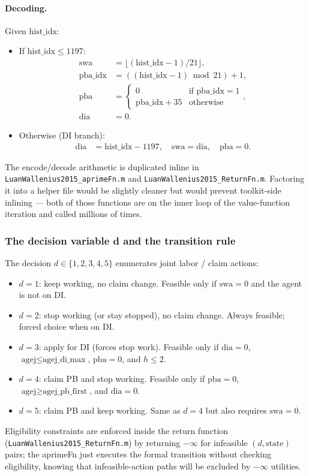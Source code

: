 \paragraph{Decoding.} Given $\text{hist\_idx}$:
\begin{itemize}
 \item If $\text{hist\_idx} \le 1197$:
 \begin{align*}
  \text{swa} &= \lfloor (\text{hist\_idx}-1)/21 \rfloor, \\
  \text{pba\_idx} &= ((\text{hist\_idx}-1) \bmod 21) + 1, \\
  \text{pba} &= \begin{cases} 0 & \text{if } \text{pba\_idx} = 1 \\ \text{pba\_idx} + 35 & \text{otherwise}\end{cases},\\
  \text{dia} &= 0.
 \end{align*}
 \item Otherwise (DI branch):
 \begin{align*}
  \text{dia} &= \text{hist\_idx} - 1197,\quad \text{swa} = \text{dia},\quad \text{pba} = 0.
 \end{align*}
\end{itemize}

The encode/decode arithmetic is duplicated inline in \verb|LuanWallenius2015_aprimeFn.m| and \verb|LuanWallenius2015_ReturnFn.m|. Factoring it into a helper file would be slightly cleaner but would prevent toolkit-side inlining --- both of those functions are on the inner loop of the value-function iteration and called millions of times.

\subsubsection{The decision variable d and the transition rule}

The decision $d \in \{1, 2, 3, 4, 5\}$ enumerates joint labor / claim actions:
\begin{itemize}
 \item $d=1$: keep working, no claim change. Feasible only if $\text{swa} = 0$ and the agent is not on DI.
 \item $d=2$: stop working (or stay stopped), no claim change. Always feasible; forced choice when on DI.
 \item $d=3$: apply for DI (forces stop work). Feasible only if $\text{dia} = 0$, $\text{agej} \le \text{agej\_di\_max}$, $\text{pba} = 0$, and $h \le 2$.
 \item $d=4$: claim PB and stop working. Feasible only if $\text{pba} = 0$, $\text{agej} \ge \text{agej\_pb\_first}$, and $\text{dia} = 0$.
 \item $d=5$: claim PB and keep working. Same as $d=4$ but also requires $\text{swa} = 0$.
\end{itemize}
Eligibility constraints are enforced inside the return function (\verb|LuanWallenius2015_ReturnFn.m|) by returning $-\infty$ for infeasible $(d, \text{state})$ pairs; the aprimeFn just executes the formal transition without checking eligibility, knowing that infeasible-action paths will be excluded by $-\infty$ utilities.

